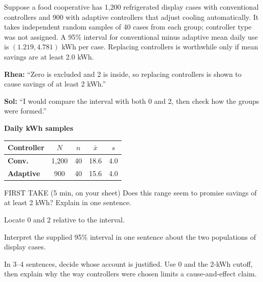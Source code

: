 \documentclass[14pt]{extarticle}
\begin{document}
\pagestyle{empty}


\noindent\begin{minipage}[t]{0.57\linewidth}
\vspace{0pt}
Suppose a food cooperative has 1{,}200 refrigerated display cases with conventional controllers and 900 with adaptive controllers that adjust cooling automatically. It takes independent random samples of 40 cases from each group; controller type was not assigned. A 95\% interval for conventional minus adaptive mean daily use is $(1.219,4.781)$ kWh per case. Replacing controllers is worthwhile only if mean savings are at least 2.0 kWh.\par\smallskip \textbf{Rhea:} ``Zero is excluded and 2 is inside, so replacing controllers is shown to cause savings of at least 2 kWh.''\par \textbf{Sol:} ``I would compare the interval with both 0 and 2, then check how the groups were formed.''\par
\end{minipage}\hfill
\begin{minipage}[t]{0.40\linewidth}
\vspace{0pt}
\begin{center}
\textbf{Daily kWh samples}\par\smallskip
\begin{tabular}{|l|c|c|c|c|}
\hline
\textbf{Controller} & \textbf{$N$} & \textbf{$n$} & \textbf{$\bar x$} & \textbf{$s$} \\ \hline
\textbf{Conv.} & 1,200 & 40 & 18.6 & 4.0 \\ \hline
\textbf{Adaptive} & 900 & 40 & 15.6 & 4.0 \\ \hline
\end{tabular}
\end{center}
\end{minipage}

\begin{firsttakebox}{FIRST TAKE (5 min, on your sheet)}
Does this range seem to promise savings of at least 2 kWh? Explain in one sentence.
\end{firsttakebox}

\begin{description}[leftmargin=1.15in, labelwidth=1in, itemsep=2pt, topsep=2pt]
  \item[\dokbadge{1}~(a)] Locate 0 and 2 relative to the interval.
  \item[\dokbadge{2}~(b)] Interpret the supplied 95\% interval in one sentence about the two populations of display cases.
  \item[\dokbadge{3}~(c)] In 3--4 sentences, decide whose account is justified. Use 0 and the 2-kWh cutoff, then explain why the way controllers were chosen limits a cause-and-effect claim.
\end{description}
\end{document}
